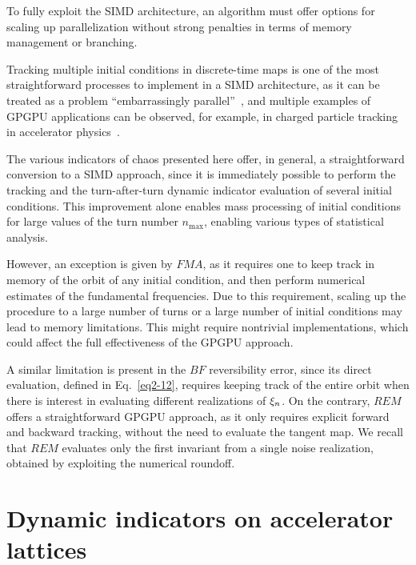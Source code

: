 \begin{chapterappendices}{}
To fully exploit the SIMD architecture, an algorithm must offer options for scaling up parallelization without strong penalties in terms of memory management or branching.

Tracking multiple initial conditions in discrete-time maps is one of the most straightforward processes to implement in a SIMD architecture, as it can be treated as a problem ``embarrassingly parallel''~\cite{Giovannozzi:317866}, and multiple examples of GPGPU applications can be observed, for example, in charged particle tracking in accelerator physics~\cite{pang2014gpu,oeftiger:hb16-mopr025,adelmann2019opal,schwinzerl:ipac21-thpab190,hermes:ipac2022-mopost045,iliakis2022enabling}.

The various indicators of chaos presented here offer, in general, a straightforward conversion to a SIMD approach, since it is immediately possible to perform the tracking and the turn-after-turn dynamic indicator evaluation of several initial conditions. This improvement alone enables mass processing of initial conditions for large values of the turn number $n_\mathrm{max}$, enabling various types of statistical analysis.

However, an exception is given by $FMA$, as it requires one to keep track in memory of the orbit of any initial condition, and then perform numerical estimates of the fundamental frequencies. Due to this requirement, scaling up the procedure to a large number of turns or a large number of initial conditions may lead to memory limitations. This might require nontrivial implementations, which could affect the full effectiveness of the GPGPU approach.

A similar limitation is present in the $BF$ reversibility error, since its direct evaluation, defined in Eq.~\eqref{eq2-12}, requires keeping track of the entire orbit when there is interest in evaluating different realizations of $\vb{\xi}_n$. On the contrary, $REM$ offers a straightforward GPGPU approach, as it only requires explicit forward and backward tracking, without the need to evaluate the tangent map. We recall that $REM$ evaluates only the first invariant from a single noise realization, obtained by exploiting the numerical roundoff.
\end{chapterappendices}
    
\chapter{Dynamic indicators on accelerator lattices}